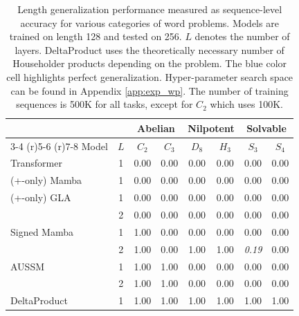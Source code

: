 \documentclass{article}
\theoremstyle{plain}
\theoremstyle{definition}
\theoremstyle{remark}
\begin{document}
\begin{table}[t]
\setlength{\tabcolsep}{0.4em}
\caption{Length generalization performance measured as sequence-level accuracy for various categories of word problems. Models are trained on length 128 and tested on 256. $L$ denotes the number of layers. DeltaProduct uses the theoretically necessary number of Householder products depending on the problem. The blue color cell highlights perfect generalization.
Hyper-parameter search space can be found in Appendix \ref{app:exp_wp}.
The number of training sequences is 500K for all tasks, except for $C_2$ which uses 100K.
}
\vspace{-2mm}

\label{tab:word_problem}
\begin{center}
\small
\begin{tabular}{lccccccc}
\toprule
& & \multicolumn{2}{c}{Abelian} & \multicolumn{2}{c}{Nilpotent} & \multicolumn{2}{c}{Solvable}  \\
 \cmidrule(r){3-4} \cmidrule(r){5-6} \cmidrule(r){7-8} 
Model   & $L$      & \multicolumn{1}{c}{$C_2$} & \multicolumn{1}{c}{$C_3$} & \multicolumn{1}{c}{$D_8$} & \multicolumn{1}{c}{$H_3$} & \multicolumn{1}{c}{$S_3$} & \multicolumn{1}{c}{$S_4$} \\ \midrule
Transformer  & 1 & 0.00 & 0.00 & 0.00 & 0.00 & 0.00 & 0.00 \\ \midrule
(+-only) Mamba & 1 & 0.00 & 0.00 &  0.00  & 0.00 & 0.00 & 0.00  \\  \midrule
(+-only) GLA & 1 &  0.00  & 0.00 & 0.00 & 0.00 & 0.00 & 0.00 \\ 
                  & 2 &  0.00  & 0.00 & 0.00 & 0.00 & 0.00 & 0.00  \\ \midrule 
Signed Mamba          & 1 & \cellcolor{blue!10} 1.00 & 0.00 & 0.00 &  0.00  & 0.00 & 0.00   \\  
& 2 & \cellcolor{blue!10} 1.00 & 0.00 & \cellcolor{blue!10} 1.00 & \cellcolor{blue!10} 1.00 & \emph{0.19} & 0.00 \\  \midrule
AUSSM    & 1 & \cellcolor{blue!10} 1.00 & \cellcolor{blue!10} 1.00 & 0.00 &  0.00  & 0.00 & 0.00    \\  
    & 2 & \cellcolor{blue!10} 1.00 & \cellcolor{blue!10} 1.00 & 0.00 & 0.00 & 0.00 & 0.00 \\  \midrule
DeltaProduct & 1 & \cellcolor{blue!10} 1.00 &  \cellcolor{blue!10}  1.00 & \cellcolor{blue!10} 1.00  & \cellcolor{blue!10} 1.00 & \cellcolor{blue!10} 1.00 &\cellcolor{blue!10} 1.00   \\
\bottomrule
\end{tabular}
\end{center}
\vspace{-6mm}
\end{table}
\end{document}
